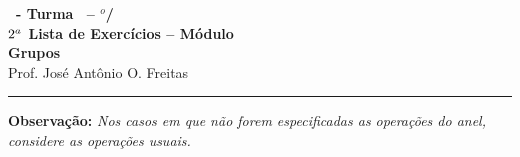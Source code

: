 \documentclass[12pt]{exam}
\begin{document}
    \begin{center}
    {\Large\bf \disciplina\ - Turma \turma\ -- \semestre$^{o}$/\ano} \\ \vspace{9pt} {\large\bf
        $2^a$ Lista de Exercícios -- Módulo \numeromodulo\\ Grupos}\\ \vspace{9pt} Prof. José Antônio O. Freitas
    \end{center}
    \hrule

    \vspace{.6cm}

    \textbf{Observação: }\textit{Nos casos em que não forem especificadas as operações do anel, considere as operações usuais.}

    \vspace{.6cm}








\end{document}
